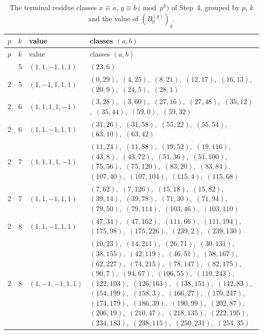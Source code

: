 \documentclass[11pt]{article}
\begin{document}
\begingroup\small
\setlength{\LTcapwidth}{\textwidth}
\begin{longtable}{@{}rrl>{\raggedright\arraybackslash}p{}@{}}
\caption{The terminal residue classes $x\equiv a$, $y\equiv b\pmod{p^k}$ of Step~4, grouped by $p$, $k$ and the value of $(B^{(g)}_p)_g$.}\label{tab:local}\\
\hline $p$ & $k$ & value & classes $(a,b)$\\\hline\endfirsthead
\hline $p$ & $k$ & value & classes $(a,b)$\\\hline\endhead\hline\endfoot
2 & 5 & $(1,1,-1,1,1)$ & $(23,6)$\\
2 & 5 & $(1,-1,1,1,1)$ & $(0,29)$,\allowbreak\ $(4,25)$,\allowbreak\ $(8,21)$,\allowbreak\ $(12,17)$,\allowbreak\ $(16,13)$,\allowbreak\ $(20,9)$,\allowbreak\ $(24,5)$,\allowbreak\ $(28,1)$\\
2 & 6 & $(1,1,1,1,-1)$ & $(3,28)$,\allowbreak\ $(3,60)$,\allowbreak\ $(27,16)$,\allowbreak\ $(27,48)$,\allowbreak\ $(35,12)$,\allowbreak\ $(35,44)$,\allowbreak\ $(59,0)$,\allowbreak\ $(59,32)$\\
2 & 6 & $(1,1,-1,1,1)$ & $(31,26)$,\allowbreak\ $(31,58)$,\allowbreak\ $(55,22)$,\allowbreak\ $(55,54)$,\allowbreak\ $(63,10)$,\allowbreak\ $(63,42)$\\
2 & 7 & $(1,1,1,1,-1)$ & $(11,24)$,\allowbreak\ $(11,88)$,\allowbreak\ $(19,52)$,\allowbreak\ $(19,116)$,\allowbreak\ $(43,8)$,\allowbreak\ $(43,72)$,\allowbreak\ $(51,36)$,\allowbreak\ $(51,100)$,\allowbreak\ $(75,56)$,\allowbreak\ $(75,120)$,\allowbreak\ $(83,20)$,\allowbreak\ $(83,84)$,\allowbreak\ $(107,40)$,\allowbreak\ $(107,104)$,\allowbreak\ $(115,4)$,\allowbreak\ $(115,68)$\\
2 & 7 & $(1,1,-1,1,1)$ & $(7,62)$,\allowbreak\ $(7,126)$,\allowbreak\ $(15,18)$,\allowbreak\ $(15,82)$,\allowbreak\ $(39,14)$,\allowbreak\ $(39,78)$,\allowbreak\ $(71,30)$,\allowbreak\ $(71,94)$,\allowbreak\ $(79,50)$,\allowbreak\ $(79,114)$,\allowbreak\ $(103,46)$,\allowbreak\ $(103,110)$\\
2 & 8 & $(1,1,-1,1,1)$ & $(47,34)$,\allowbreak\ $(47,162)$,\allowbreak\ $(111,66)$,\allowbreak\ $(111,194)$,\allowbreak\ $(175,98)$,\allowbreak\ $(175,226)$,\allowbreak\ $(239,2)$,\allowbreak\ $(239,130)$\\
2 & 8 & $(1,-1,-1,1,1)$ & $(10,23)$,\allowbreak\ $(14,211)$,\allowbreak\ $(26,71)$,\allowbreak\ $(30,131)$,\allowbreak\ $(38,155)$,\allowbreak\ $(42,119)$,\allowbreak\ $(46,51)$,\allowbreak\ $(58,167)$,\allowbreak\ $(62,227)$,\allowbreak\ $(74,215)$,\allowbreak\ $(78,147)$,\allowbreak\ $(82,175)$,\allowbreak\ $(90,7)$,\allowbreak\ $(94,67)$,\allowbreak\ $(106,55)$,\allowbreak\ $(110,243)$,\allowbreak\ $(122,103)$,\allowbreak\ $(126,163)$,\allowbreak\ $(138,151)$,\allowbreak\ $(142,83)$,\allowbreak\ $(154,199)$,\allowbreak\ $(158,3)$,\allowbreak\ $(166,27)$,\allowbreak\ $(170,247)$,\allowbreak\ $(174,179)$,\allowbreak\ $(186,39)$,\allowbreak\ $(190,99)$,\allowbreak\ $(202,87)$,\allowbreak\ $(206,19)$,\allowbreak\ $(210,47)$,\allowbreak\ $(218,135)$,\allowbreak\ $(222,195)$,\allowbreak\ $(234,183)$,\allowbreak\ $(238,115)$,\allowbreak\ $(250,231)$,\allowbreak\ $(254,35)$\\

\end{longtable}
\end{document}
